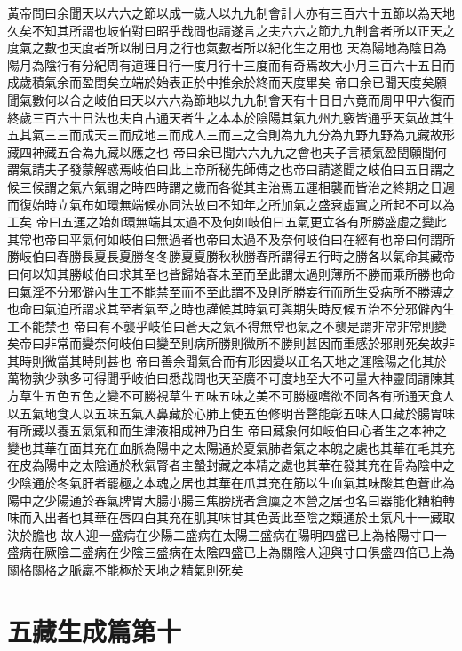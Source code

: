 黃帝問曰余聞天以六六之節以成一歲人以九九制會計人亦有三百六十五節以為天地久矣不知其所謂也岐伯對曰昭乎哉問也請遂言之夫六六之節九九制會者所以正天之度氣之數也天度者所以制日月之行也氣數者所以紀化生之用也
天為陽地為陰日為陽月為陰行有分紀周有道理日行一度月行十三度而有奇焉故大小月三百六十五日而成歲積氣余而盈閏矣立端於始表正於中推余於終而天度畢矣
帝曰余已聞天度矣願聞氣數何以合之岐伯曰天以六六為節地以九九制會天有十日日六竟而周甲甲六復而終歲三百六十日法也夫自古通天者生之本本於陰陽其氣九州九竅皆通乎天氣故其生五其氣三三而成天三而成地三而成人三而三之合則為九九分為九野九野為九藏故形藏四神藏五合為九藏以應之也
帝曰余已聞六六九九之會也夫子言積氣盈閏願聞何謂氣請夫子發蒙解惑焉岐伯曰此上帝所秘先師傳之也帝曰請遂聞之岐伯曰五日謂之候三候謂之氣六氣謂之時四時謂之歲而各從其主治焉五運相襲而皆治之終期之日週而復始時立氣布如環無端候亦同法故曰不知年之所加氣之盛衰虛實之所起不可以為工矣
帝曰五運之始如環無端其太過不及何如岐伯曰五氣更立各有所勝盛虛之變此其常也帝曰平氣何如岐伯曰無過者也帝曰太過不及奈何岐伯曰在經有也帝曰何謂所勝岐伯曰春勝長夏長夏勝冬冬勝夏夏勝秋秋勝春所謂得五行時之勝各以氣命其藏帝曰何以知其勝岐伯曰求其至也皆歸始春未至而至此謂太過則薄所不勝而乘所勝也命曰氣淫不分邪僻內生工不能禁至而不至此謂不及則所勝妄行而所生受病所不勝薄之也命曰氣迫所謂求其至者氣至之時也謹候其時氣可與期失時反候五治不分邪僻內生工不能禁也
帝曰有不襲乎岐伯曰蒼天之氣不得無常也氣之不襲是謂非常非常則變矣帝曰非常而變奈何岐伯曰變至則病所勝則微所不勝則甚因而重感於邪則死矣故非其時則微當其時則甚也
帝曰善余聞氣合而有形因變以正名天地之運陰陽之化其於萬物孰少孰多可得聞乎岐伯曰悉哉問也天至廣不可度地至大不可量大神靈問請陳其方草生五色五色之變不可勝視草生五味五味之美不可勝極嗜欲不同各有所通天食人以五氣地食人以五味五氣入鼻藏於心肺上使五色修明音聲能彰五味入口藏於腸胃味有所藏以養五氣氣和而生津液相成神乃自生
帝曰藏象何如岐伯曰心者生之本神之變也其華在面其充在血脈為陽中之太陽通於夏氣肺者氣之本魄之處也其華在毛其充在皮為陽中之太陰通於秋氣腎者主蟄封藏之本精之處也其華在發其充在骨為陰中之少陰通於冬氣肝者罷極之本魂之居也其華在爪其充在筋以生血氣其味酸其色蒼此為陽中之少陽通於春氣脾胃大腸小腸三焦膀胱者倉廩之本營之居也名曰器能化糟粕轉味而入出者也其華在唇四白其充在肌其味甘其色黃此至陰之類通於土氣凡十一藏取決於膽也
故人迎一盛病在少陽二盛病在太陽三盛病在陽明四盛已上為格陽寸口一盛病在厥陰二盛病在少陰三盛病在太陰四盛已上為關陰人迎與寸口俱盛四倍已上為關格關格之脈羸不能極於天地之精氣則死矣


\section{五藏生成篇第十}

